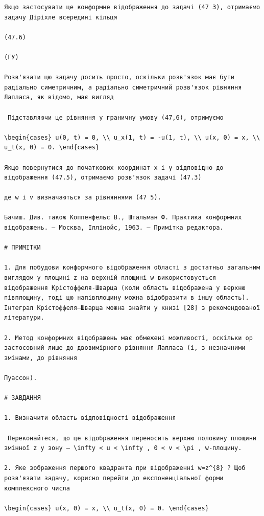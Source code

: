 \documentclass[
  ukrainian,
]{article}
\begin{document}
\begin{verbatim}
Якщо застосувати це конформне відображення до задачі (47 3), отримаємо задачу Діріхле всередині кільця

(47.6)

(ГУ)

Розв'язати цю задачу досить просто, оскільки розв'язок має бути радіально симетричним, а радіально симетричний розв'язок рівняння Лапласа, як відомо, має вигляд

 Підставляючи це рівняння у граничну умову (47,6), отримуємо

\begin{cases} u(0, t) = 0, \\ u_x(1, t) = -u(1, t), \\ u(x, 0) = x, \\ u_t(x, 0) = 0. \end{cases}

Якщо повернутися до початкових координат x і y відповідно до відображення (47.5), отримаємо розв'язок задачі (47.3)

де w і v визначаються за рівняннями (47 5).

Бачиш. Див. також Коппенфельс В., Штальман Ф. Практика конформних відображень. — Москва, Іллінойс, 1963. — Примітка редактора.

# ПРИМІТКИ

1. Для побудови конформного відображення області з достатньо загальним виглядом у площині z на верхній площині w використовується відображення Крістоффеля-Шварца (коли область відображена у верхню півплощину, тоді цю напівплощину можна відобразити в іншу область). Інтеграл Крістоффеля–Шварца можна знайти у книзі [28] з рекомендованої літератури.

2. Метод конформних відображень має обмежені можливості, оскільки op застосовний лише до двовимірного рівняння Лапласа (і, з незначними змінами, до рівняння

Пуассон).

# ЗАВДАННЯ

1. Визначити область відповідності відображення

 Переконайтеся, що це відображення переносить верхню половину площини змінної z у зону — \infty < u < \infty , 0 < v < \pi , w-площину.

2. Яке зображення першого квадранта при відображенні w=z^{8} ? Щоб розв'язати задачу, корисно перейти до експоненціальної форми комплексного числа

\begin{cases} u(x, 0) = x, \\ u_t(x, 0) = 0. \end{cases}


\end{verbatim}
\end{document}
